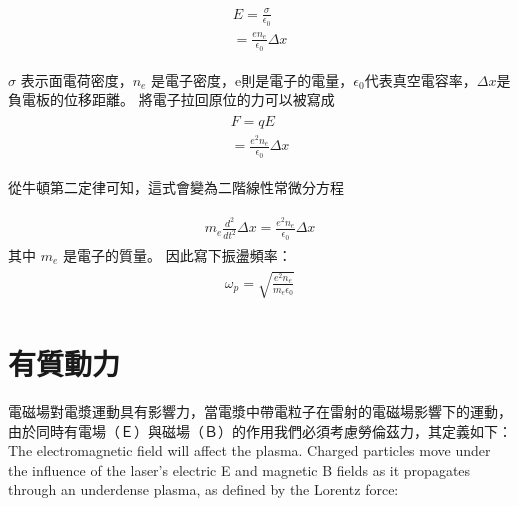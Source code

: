 \begin{align}
  \begin{split}
    E = \frac{\sigma}{\epsilon_{0}}
    \\
    = \frac{en_{e}}{\epsilon_{0}} \Delta x
  \end{split}
\end{align}

\(\sigma\) 表示面電荷密度，\(n_{e}\) 是電子密度，e則是電子的電量，\(\epsilon_{0}\)代表真空電容率，\(\Delta x\)是負電板的位移距離。
將電子拉回原位的力可以被寫成
\begin{align}
  \begin{split}
    F = qE
    \\
    = \frac{e^{2}n_{e}}{\epsilon_{0}} \Delta x
  \end{split}
\end{align}

從牛頓第二定律可知，這式會變為二階線性常微分方程

\begin{align}
  \begin{split}
    m_{e}\frac{d^2}{dt^2}\Delta x = \frac{e^{2}n_{e}}{\epsilon_{0}} \Delta x
  \end{split}
\end{align}
其中 \(m_{e}\) 是電子的質量。 因此寫下振盪頻率：
\begin{align}
  \begin{split}
    \omega_{p} = \sqrt{\frac{e^{2}n_{e}}{m_{e}\epsilon_{0}}}
  \end{split}
\end{align}

\section{有質動力}%
電磁場對電漿運動具有影響力，當電漿中帶電粒子在雷射的電磁場影響下的運動，由於同時有電場（Ｅ）與磁場（Ｂ）的作用我們必須考慮勞倫茲力，其定義如下：
The electromagnetic field will affect the plasma. Charged particles move under the influence of the laser's electric E and magnetic B fields as it propagates through an underdense plasma, as defined by the Lorentz force:

